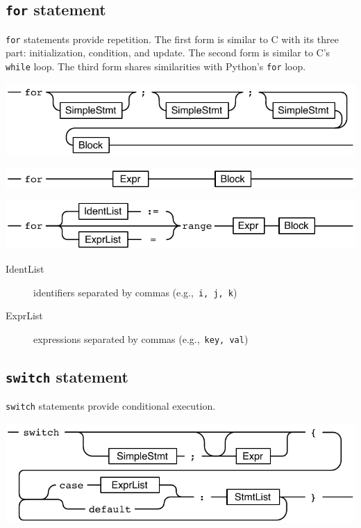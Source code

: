 \documentclass{article}
\begin{document}
\begin{multicols*}{3}
  \filbreak
  \subsection*{\texttt{for} statement}

  \lstinline{for} statements provide repetition.
  The first form is similar to C with its three part: initialization, condition, and update.
  The second form is similar to C's \texttt{while} loop.
  The third form shares similarities with Python's \lstinline{for} loop.

  \includegraphics[width=\linewidth]{for-3parts}

  \includegraphics[width=\linewidth]{for-1cond}

  \includegraphics[width=\linewidth]{for-range}

  \begin{description}
  \item[IdentList] identifiers separated by commas (e.g.,~\lstinline{i, j, k})
  \item[ExprList] expressions separated by commas (e.g.,~\lstinline{key, val})
  \end{description}

  \filbreak
  \subsection*{\lstinline{switch} statement}

  \lstinline{switch} statements provide conditional execution.

  \includegraphics[width=\linewidth]{switch-expr}


\end{multicols*}
\end{document}

